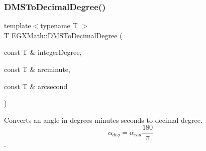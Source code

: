 \mbox{\label{group___e_g_x_math-_angle_conversions-_d_m_s_ga10e325fbb65f6e2e7d8cd7d3d8af2931}} 
\subsubsection{\texorpdfstring{D\+M\+S\+To\+Decimal\+Degree()}{DMSToDecimalDegree()}}
{\footnotesize\ttfamily template$<$typename T $>$ \\
T E\+G\+X\+Math\+::\+D\+M\+S\+To\+Decimal\+Degree (\begin{DoxyParamCaption}\item[{const T \&}]{integer\+Degree,  }\item[{const T \&}]{arcminute,  }\item[{const T \&}]{arcsecond }\end{DoxyParamCaption})}



Converts an angle in degrees minutes seconds to decimal degree. \[\alpha_{deg}=\alpha_{rad}\frac{180}{\pi}\]. 

